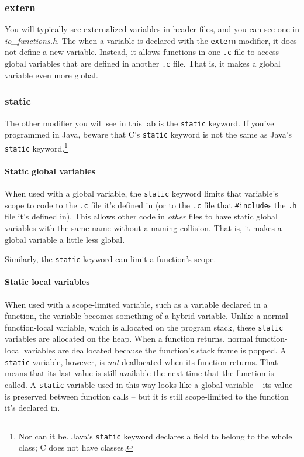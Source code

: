 \subsubsection{extern}

You will typically see externalized variables in header files, and you can see one in \textit{io\_functions.h}.
The when a variable is declared with the \lstinline{extern} modifier, it does not define a new variable.
Instead, it allows functions in one \texttt{.c} file to access global variables that are defined in another \texttt{.c} file.
That is, it makes a global variable even more global.

\subsubsection{static}

The other modifier you will see in this lab is the \lstinline{static} keyword.
If you've programmed in Java, beware that C's \lstinline{static} keyword is not the same as Java's \lstinline{static} keyword.\footnote{
    Nor can it be.
    Java's \lstinline{static} keyword declares a field to belong to the whole class;
    C does not have classes.
}

\paragraph{Static global variables}

When used with a global variable, the \lstinline{static} keyword limits that variable's scope to code to the \texttt{.c} file it's defined in (or to the \texttt{.c} file that \lstinline{#include}s the \texttt{.h} file it's defined in).
This allows other code in \textit{other} files to have static global variables with the same name without a naming collision.
That is, it makes a global variable a little less global.

Similarly, the \lstinline{static} keyword can limit a function's scope.

\paragraph{Static local variables}

When used with a scope-limited variable, such as a variable declared in a function, the variable becomes something of a hybrid variable.
Unlike a normal function-local variable, which is allocated on the program stack, these \lstinline{static} variables are allocated on the heap.
When a function returns, normal function-local variables are deallocated because the function's stack frame is popped.
A \lstinline{static} variable, however, is \textit{not} deallocated when its function returns.
That means that its last value is still available the next time that the function is called.
A \lstinline{static} variable used in this way looks like a global variable -- its value is preserved between function calls -- but it is still scope-limited to the function it's declared in.

